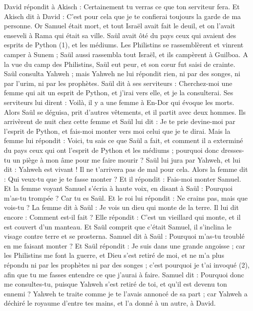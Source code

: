 \begin{multicols}{2}
David répondit à Akisch : Certainement tu verras ce que ton serviteur fera. Et Akisch dit à David : C'est pour cela que je te confierai toujours la garde de ma personne.
Or Samuel était mort, et tout Israël avait fait le deuil, et on l'avait enseveli à Rama qui était sa ville. Saül avait ôté du pays ceux qui avaient des esprits de Python (1), et les médiums.
Les Philistins se rassemblèrent et vinrent camper à Sunem ; Saül aussi rassembla tout Israël, et ils campèrent à Guilboa.
A la vue du camp des Philistins, Saül eut peur, et son cœur fut saisi de crainte.
Saül consulta Yahweh ; mais Yahweh ne lui répondit rien, ni par des songes, ni par l'urim, ni par les prophètes.
Saül dit à ses serviteurs : Cherchez-moi une femme qui ait un esprit de Python, et j'irai vers elle, et je la consulterai. Ses serviteurs lui dirent : Voilà, il y a une femme à En-Dor qui évoque les morts.
Alors Saül se déguisa, prit d'autres vêtements, et il partit avec deux hommes. Ils arrivèrent de nuit chez cette femme et Saül lui dit : Je te prie devine-moi par l’esprit de Python, et fais-moi monter vers moi celui que je te dirai.
Mais la femme lui répondit : Voici, tu sais ce que Saül a fait, et comment il a exterminé du pays ceux qui ont l'esprit de Python et les médiums ; pourquoi donc dresses-tu un piège à mon âme pour me faire mourir ?
Saül lui jura par Yahweh, et lui dit : Yahweh est vivant ! Il ne t’arrivera pas de mal pour cela.
Alors la femme dit : Qui veux-tu que je te fasse monter ? Et il répondit : Fais-moi monter Samuel.
Et la femme voyant Samuel s'écria à haute voix, en disant à Saül : Pourquoi m'as-tu trompée ? Car tu es Saül.
Et le roi lui répondit : Ne crains pas, mais que vois-tu ? La femme dit à Saül : Je vois un dieu qui monte de la terre.
Il lui dit encore : Comment est-il fait ? Elle répondit : C'est un vieillard qui monte, et il est couvert d'un manteau. Et Saül comprit que c'était Samuel, il s’inclina le visage contre terre et se prosterna.
Samuel dit à Saül : Pourquoi m'as-tu troublé en me faisant monter ? Et Saül répondit : Je suis dans une grande angoisse ; car les Philistins me font la guerre, et Dieu s'est retiré de moi, et ne m'a plus répondu ni par les prophètes ni par des songes ; c'est pourquoi je t'ai invoqué (2), afin que tu me fasses entendre ce que j'aurai à faire.
Samuel dit : Pourquoi donc me consultes-tu, puisque Yahweh s'est retiré de toi, et qu'il est devenu ton ennemi ?
Yahweh te traite comme je te l’avais annoncé de sa part ; car Yahweh a déchiré le royaume d'entre tes mains, et l'a donné à un autre, à David.

\end{multicols}
